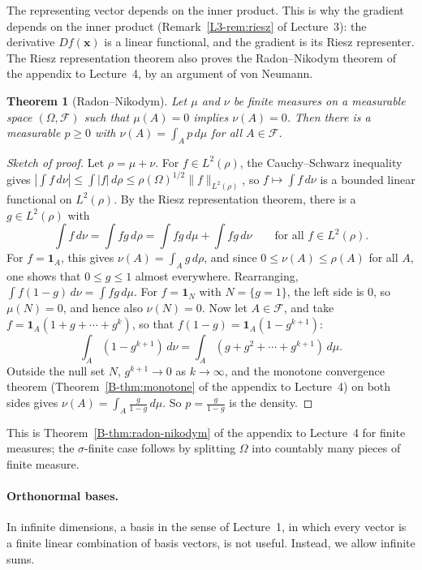 \documentclass[11pt]{article}
\newcommand{\norm}[1]{\lVert #1 \rVert}
\theoremstyle{definition}
\theoremstyle{plain}
\newtheorem{theorem}[definition]{Theorem}
\theoremstyle{remark}
\begin{document}
The representing vector depends on the inner product. This is why the gradient depends on the inner product (Remark~\ref{L3-rem:riesz} of Lecture~3): the derivative $Df(\mathbf{x})$ is a linear functional, and the gradient is its Riesz representer. The Riesz representation theorem also proves the Radon--Nikodym theorem of the appendix to Lecture~4, by an argument of von Neumann.

\begin{theorem}[Radon--Nikodym]\label{thm:radon-nikodym-proof}
    Let $\mu$ and $\nu$ be finite measures on a measurable space $(\Omega, \mathcal{F})$ such that $\mu(A) = 0$ implies $\nu(A) = 0$. Then there is a measurable $p \geq 0$ with $\nu(A) = \int_A p\, d\mu$ for all $A \in \mathcal{F}$.
\end{theorem}

\begin{proof}[Sketch of proof]
    Let $\rho = \mu + \nu$. For $f \in L^2(\rho)$, the Cauchy--Schwarz inequality gives $|\int f\, d\nu| \leq \int |f|\, d\rho \leq \rho(\Omega)^{1/2}\norm{f}_{L^2(\rho)}$, so $f \mapsto \int f\, d\nu$ is a bounded linear functional on $L^2(\rho)$. By the Riesz representation theorem, there is a $g \in L^2(\rho)$ with
    \[\int f\, d\nu = \int fg\, d\rho = \int fg\, d\mu + \int fg\, d\nu \qquad \text{for all } f \in L^2(\rho).\]
    For $f = \mathbf{1}_A$, this gives $\nu(A) = \int_A g\, d\rho$, and since $0 \leq \nu(A) \leq \rho(A)$ for all $A$, one shows that $0 \leq g \leq 1$ almost everywhere. Rearranging, $\int f(1 - g)\, d\nu = \int fg\, d\mu$. For $f = \mathbf{1}_N$ with $N = \{g = 1\}$, the left side is $0$, so $\mu(N) = 0$, and hence also $\nu(N) = 0$. Now let $A \in \mathcal{F}$, and take $f = \mathbf{1}_A(1 + g + \cdots + g^k)$, so that $f(1 - g) = \mathbf{1}_A(1 - g^{k+1})$:
    \[\int_A (1 - g^{k+1})\, d\nu = \int_A (g + g^2 + \cdots + g^{k+1})\, d\mu.\]
    Outside the null set $N$, $g^{k+1} \to 0$ as $k \to \infty$, and the monotone convergence theorem (Theorem~\ref{B-thm:monotone} of the appendix to Lecture~4) on both sides gives $\nu(A) = \int_A \frac{g}{1 - g}\, d\mu$. So $p = \frac{g}{1 - g}$ is the density.
\end{proof}

This is Theorem~\ref{B-thm:radon-nikodym} of the appendix to Lecture~4 for finite measures; the $\sigma$-finite case follows by splitting $\Omega$ into countably many pieces of finite measure.

\paragraph{Orthonormal bases.} In infinite dimensions, a basis in the sense of Lecture~1, in which every vector is a finite linear combination of basis vectors, is not useful. Instead, we allow infinite sums.
\end{document}

